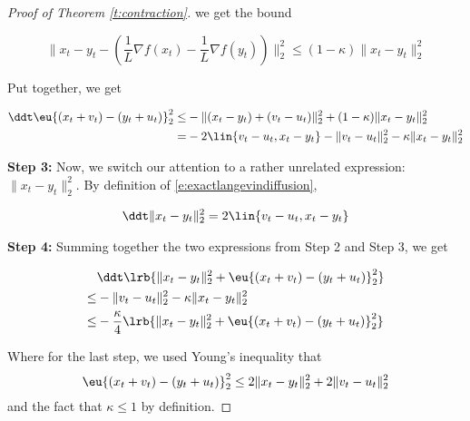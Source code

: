 \begin{proof}[Proof of Theorem \ref{t:contraction}]
we get the bound 

$$\|x_t-y_t - (\frac{1}{L} \nabla f(x_t) - \frac{1}{L} \nabla f(y_t))\|_2^2\leq (1-\kappa)\|x_t-y_t\|_2^2$$

Put together, we get

\begin{align*}
\ddt \eu{(x_t+v_t) - (y_t+u_t)}_2^2
\leq& -\|(x_t-y_t) + (v_t-u_t)\|_2^2 + (1-\kappa) \|x_t-y_t\|_2^2\\
=& -2 \lin{v_t-u_t,x_t-y_t} - \|v_t-u_t\|_2^2- \kappa \|x_t-y_t\|_2^2
\end{align*}

\textbf{Step 3:}
Now, we switch our attention to a rather unrelated expression: $\|x_t-y_t\|_2^2$. By definition of \eqref{e:exactlangevindiffusion},

\begin{align*}
\ddt \|x_t-y_t\|_2^2 = 2\lin{v_t-u_t, x_t-y_t}
\end{align*}

\textbf{Step 4:}
Summing together the two expressions from Step 2 and Step 3, we get

\begin{align*}
&\ddt \lrb{\|x_t-y_t\|_2^2 +\eu{(x_t+v_t) - (y_t+u_t)}_2^2}\\
\leq & -\|v_t-u_t\|_2^2 -\kappa  \|x_t-y_t\|_2^2\\
\leq & -\frac{\kappa}{4} \lrb{\|x_t-y_t\|_2^2 + \eu{(x_t+v_t) - (y_t+u_t)}_2^2}
\end{align*}

Where for the last step, we used Young's inequality that 
$$\eu{(x_t+v_t) - (y_t+u_t)}_2^2\leq 2\|x_t-y_t\|_2^2 + 2\|v_t-u_t\|_2^2$$
and the fact that $\kappa\leq 1$ by definition.
\end{proof}